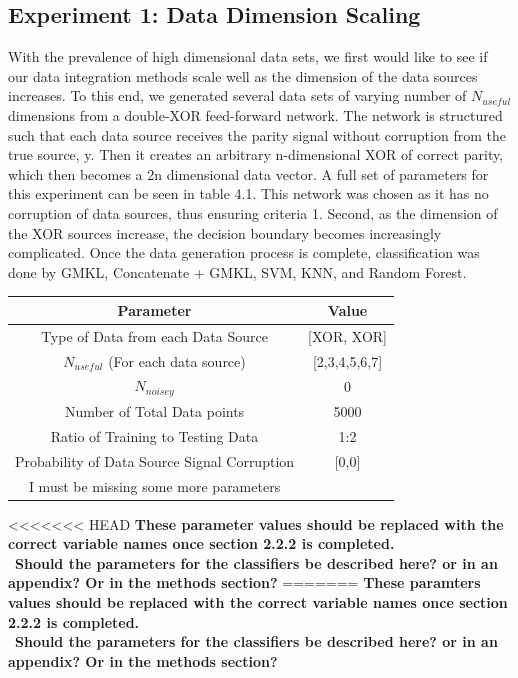 \documentclass{article}
\begin{document}
\subsection{Experiment 1: Data Dimension Scaling}
With the prevalence of high dimensional data sets, we first would like to see
if our data integration methods scale well as the dimension of the data sources
increases. To this end, we generated several data sets of varying number of
$N_{useful}$ dimensions from a double-XOR feed-forward network. The network is
structured such that each data source receives the parity signal without
corruption from the true source, y. Then it creates an arbitrary n-dimensional
XOR of correct parity, which then becomes a 2n dimensional data vector.  A full
set of parameters for this experiment can be seen in table 4.1. This network was
chosen as it has no corruption of data sources, thus ensuring criteria 1.
Second, as the dimension of the XOR sources increase, the decision boundary becomes
increasingly complicated. Once the data generation process is complete,
classification was done by GMKL, Concatenate + GMKL, SVM, KNN, and Random
Forest.
\begin{table}[h!]
\centering
 \begin{tabular}{|c c|} 
 \hline
Parameter & Value \\ 
\hline
Type of Data from each Data Source & [XOR, XOR]\\
$N_{useful}$ (For each data source) & [2,3,4,5,6,7] \\
$N_{noisey}$& 0\\
Number of Total Data points & 5000\\
Ratio of Training to Testing Data & 1:2\\
Probability of Data Source Signal Corruption & [0,0]\\
I must be missing some more parameters\\
\hline
 \end{tabular}
\end{table}
<<<<<<< HEAD
\textbf{These parameter values should be replaced with the correct variable
    names once section 2.2.2 is completed. }\\\
\textbf{Should the parameters for the classifiers be described here? or in an
    appendix? Or in the methods section? }
=======
\textbf{These paramters values should be replaced with the correct variable names once section 2.2.2 is completed. }\\\
\textbf{Should the parameters for the classifiers be described here? or in an appendix? Or in the methods section? }
\end{document}
